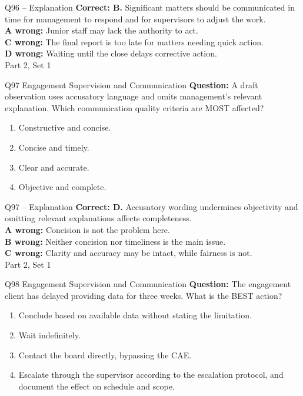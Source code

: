 \documentclass[aspectratio=169,10pt]{beamer}
\begin{document}
\begin{frame}[t]{Q96 -- Explanation}
	\footnotesize
	\textbf{Correct: B.} Significant matters should be communicated in time for management to respond and for supervisors to adjust the work. \\[5pt]
\textbf{A wrong:} Junior staff may lack the authority to act. \\[3pt]
\textbf{C wrong:} The final report is too late for matters needing quick action. \\[3pt]
\textbf{D wrong:} Waiting until the close delays corrective action. \\[3pt]
	\vfill {\tiny Part 2, Set 1}
\end{frame}
\begin{frame}[t]{Q97 \hfill {\scriptsize Engagement Supervision and Communication}}
	\small
	\textbf{Question:} A draft observation uses accusatory language and omits management's relevant explanation. Which communication quality criteria are MOST affected?
	\begin{enumerate}[label=\Alph*.,itemsep=1pt,topsep=3pt]
			\item Constructive and concise.
			\item Concise and timely.
			\item Clear and accurate.
			\item Objective and complete.
	\end{enumerate}
\end{frame}
\begin{frame}[t]{Q97 -- Explanation}
	\footnotesize
	\textbf{Correct: D.} Accusatory wording undermines objectivity and omitting relevant explanations affects completeness. \\[5pt]
\textbf{A wrong:} Concision is not the problem here. \\[3pt]
\textbf{B wrong:} Neither concision nor timeliness is the main issue. \\[3pt]
\textbf{C wrong:} Clarity and accuracy may be intact, while fairness is not. \\[3pt]
	\vfill {\tiny Part 2, Set 1}
\end{frame}
\begin{frame}[t]{Q98 \hfill {\scriptsize Engagement Supervision and Communication}}
	\small
	\textbf{Question:} The engagement client has delayed providing data for three weeks. What is the BEST action?
	\begin{enumerate}[label=\Alph*.,itemsep=1pt,topsep=3pt]
			\item Conclude based on available data without stating the limitation.
			\item Wait indefinitely.
			\item Contact the board directly, bypassing the CAE.
			\item Escalate through the supervisor according to the escalation protocol, and document the effect on schedule and scope.
	\end{enumerate}
\end{frame}
\end{document}

